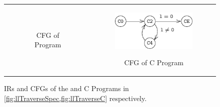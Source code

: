 \begin{figure}
\begin{tabular}{cc}
\begin{subfigure}[b]{0.45\textwidth}
\begin{center}
\end{center}
\caption{\label{fig:llTraverseSpecCFG}CFG of \SpecL{} Program}
\end{subfigure}%
&
\begin{subfigure}[b]{0.55\textwidth}
\begin{center}
{\includegraphics[scale=1.3]{chapters/figures/figSumListCCfg.pdf}}
\end{center}
\caption{\label{fig:llTraverseCCFG}CFG of C Program}
\end{subfigure}%
\\
\end{tabular}
\caption{\label{fig:llTraverseSpecAndCIRAndCFG}IRs and CFGs of the \SpecL{} and C Programs in \cref{fig:llTraverseSpec,fig:llTraverseC} respectively.}
\end{figure}
